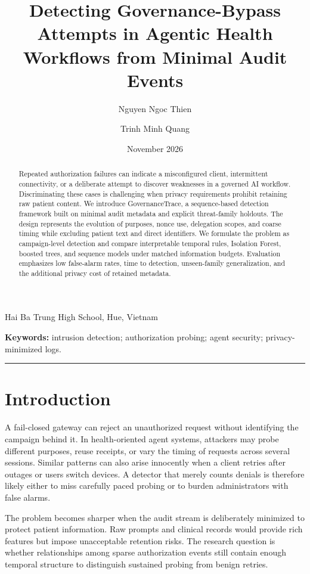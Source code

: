 \documentclass[11pt,a4paper]{article}
\title{\vspace{-1em}\textbf{Detecting Governance-Bypass Attempts in Agentic Health Workflows from Minimal Audit Events}}
\author{Nguyen Ngoc Thien \and Trinh Minh Quang}\date{November 2026}
\begin{document}
\maketitle
\begin{center}\small Hai Ba Trung High School, Hue, Vietnam\end{center}
\begin{abstract}
Repeated authorization failures can indicate a misconfigured client, intermittent connectivity, or a deliberate attempt to discover weaknesses in a governed AI workflow. Discriminating these cases is challenging when privacy requirements prohibit retaining raw patient content. We introduce GovernanceTrace, a sequence-based detection framework built on minimal audit metadata and explicit threat-family holdouts. The design represents the evolution of purposes, nonce use, delegation scopes, and coarse timing while excluding patient text and direct identifiers. We formulate the problem as campaign-level detection and compare interpretable temporal rules, Isolation Forest, boosted trees, and sequence models under matched information budgets. Evaluation emphasizes low false-alarm rates, time to detection, unseen-family generalization, and the additional privacy cost of retained metadata.
\end{abstract}
\noindent\textbf{Keywords:} intrusion detection; authorization probing; agent security; privacy-minimized logs.
\medskip\hrule\medskip

\section{Introduction}
A fail-closed gateway can reject an unauthorized request without identifying the campaign behind it. In health-oriented agent systems, attackers may probe different purposes, reuse receipts, or vary the timing of requests across several sessions. Similar patterns can also arise innocently when a client retries after outages or users switch devices. A detector that merely counts denials is therefore likely either to miss carefully paced probing or to burden administrators with false alarms.

The problem becomes sharper when the audit stream is deliberately minimized to protect patient information. Raw prompts and clinical records would provide rich features but impose unacceptable retention risks. The research question is whether relationships among sparse authorization events still contain enough temporal structure to distinguish sustained probing from benign retries.
\end{document}
